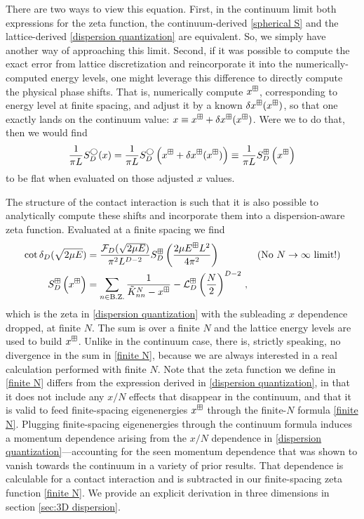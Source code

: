 There are two ways to view this equation.
First, in the continuum limit both expressions for the zeta function, the continuum-derived \eqref{spherical S} and the lattice-derived \eqref{dispersion quantization} are equivalent.
So, we simply have another way of approaching this limit.
Second, if it was possible to compute the exact error from lattice discretization and reincorporate it into the numerically-computed energy levels, one might leverage this difference to directly compute the physical phase shifts.
That is, numerically compute $x^\boxplus$, corresponding to energy level at finite spacing, and adjust it by a known $\delta x^\boxplus(x^\boxplus)$, so that one exactly lands on the continuum value: $x \equiv x^\boxplus + \delta x^\boxplus(x^\boxplus)$.
Were we to do that, then we would find
\begin{equation}
    \frac{1}{\pi L}S^\bigcirc_D(x)
    =
    \frac{1}{\pi L}S^\bigcirc_D\left(x^\boxplus+\delta x^\boxplus(x^\boxplus)\right)
    \equiv
    \frac{1}{\pi L}S^\boxplus_D\left(x^\boxplus\right)
\end{equation}
to be flat when evaluated on those adjusted $x$ values.

The structure of the contact interaction is such that it is also possible to analytically compute these shifts and incorporate them into a dispersion-aware zeta function.
Evaluated at a finite spacing we find
\begin{align}
    \cot \delta_D(\sqrt{2\mu E})
    &=
    \frac{\mathcal{F}_D(\sqrt{2\mu E})}{\pi^2 L^{D-2}} S^{\boxplus }_D\left(\frac{2\mu E^{\boxplus} L^2}{4\pi^2}\right)
    && \text{(No $N\rightarrow\infty$ limit!)}
    \\
    \label{eq:finite N}
    S^{\boxplus}_D\left(x^\boxplus\right)
    &=
		\sum_{n\in\text{B.Z.}}\frac{1}{ \tilde K_{nn}^{N} - x^\boxplus} - \mathcal{L}_D^{\boxplus}\left(\frac{N}{2}\right)^{D-2}
	\, ,
\end{align}
which is the zeta in \eqref{dispersion quantization} with the subleading $x$ dependence dropped, at finite $N$.
The sum is over a finite $N$ and the lattice energy levels are used to build $x^\boxplus$.
Unlike in the continuum case, there is, strictly speaking, no divergence in the sum in \eqref{finite N}, because we are always interested in a real calculation performed with finite $N$.
Note that the zeta function we define in \eqref{finite N} differs from the expression derived in \eqref{dispersion quantization}, in that it does not include any $x/N$ effects that disappear in the continuum, and that it is valid to feed finite-spacing eigenenergies $x^\boxplus$ through the finite-$N$ formula \eqref{finite N}.
Plugging finite-spacing eigenenergies through the continuum formula induces a momentum dependence arising from the $x/N$ dependence in \eqref{dispersion quantization}---accounting for the seen momentum dependence that was shown to vanish towards the continuum in a variety of prior results.
That dependence is calculable for a contact interaction and is subtracted in our finite-spacing zeta function \eqref{finite N}.
We provide an explicit derivation in three dimensions in section \ref{sec:3D dispersion}.

